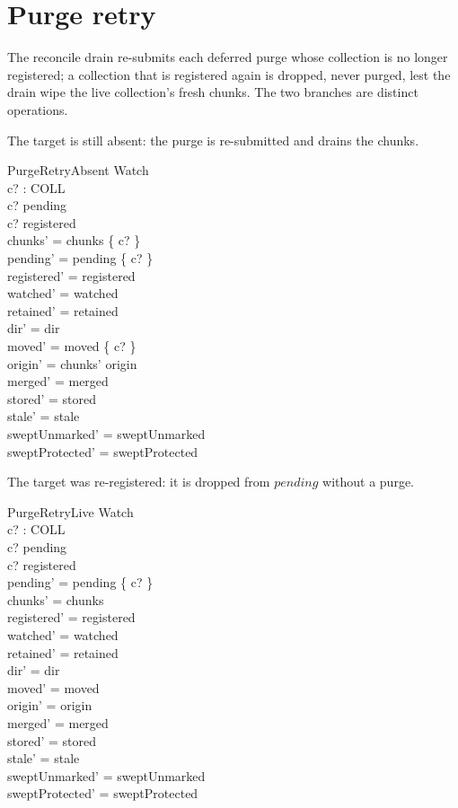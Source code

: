 \documentclass[a4paper]{article}
\begin{document}
\section{Purge retry}

The reconcile drain re-submits each deferred purge whose collection is no longer
registered; a collection that is registered again is dropped, never purged, lest
the drain wipe the live collection's fresh chunks.  The two branches are
distinct operations.

The target is still absent: the purge is re-submitted and drains the chunks.

\begin{schema}{PurgeRetryAbsent}
  \Delta Watch \\
  c? : COLL \\
  \where
  c? \in pending \\
  c? \notin registered \\
  chunks' = chunks \setminus \{ c? \} \\
  pending' = pending \setminus \{ c? \} \\
  registered' = registered \\
  watched' = watched \\
  retained' = retained \\
  dir' = dir \\
  moved' = moved \setminus \{ c? \} \\
  origin' = chunks' \dres origin \\
  merged' = merged \\
  stored' = stored \\
  stale' = stale \\
  sweptUnmarked' = sweptUnmarked \\
  sweptProtected' = sweptProtected
\end{schema}

The target was re-registered: it is dropped from $pending$ without a purge.

\begin{schema}{PurgeRetryLive}
  \Delta Watch \\
  c? : COLL \\
  \where
  c? \in pending \\
  c? \in registered \\
  pending' = pending \setminus \{ c? \} \\
  chunks' = chunks \\
  registered' = registered \\
  watched' = watched \\
  retained' = retained \\
  dir' = dir \\
  moved' = moved \\
  origin' = origin \\
  merged' = merged \\
  stored' = stored \\
  stale' = stale \\
  sweptUnmarked' = sweptUnmarked \\
  sweptProtected' = sweptProtected
\end{schema}
\end{document}
